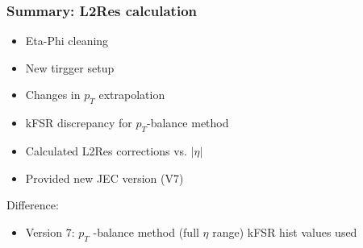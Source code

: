 \documentclass[t,compress]{beamer}
\begin{document}
 \begin{frame}
\frametitle{Summary: L2Res calculation}
\vspace{-0.5cm}
\begin{itemize}
 \item Eta-Phi cleaning
 \item New tirgger setup
 \item Changes in $p_T$ extrapolation
 \item kFSR discrepancy for $p_T$-balance method
 \item Calculated L2Res corrections vs. $|\eta|$
 \item Provided new JEC version (V7)
 \end{itemize}
 Difference:
\begin{itemize}
 \item Version 7: $p_T$ -balance method (full $\eta$ range) kFSR hist values used 
 \end{itemize}
 \end{frame} 
%   
%  
\end{document}
